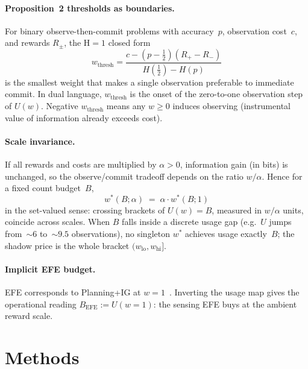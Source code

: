 \documentclass[runningheads]{llncs}
\begin{document}
\paragraph{Proposition~2 thresholds as boundaries.}
For binary observe-then-commit problems with accuracy~$p$, observation cost~$c$, and rewards $R_\pm$, the H${=}1$ closed form~\citep{cooper2026efe}
\begin{equation}
\label{eq:prop2}
w_{\mathrm{thresh}}
=
\frac{c-(p-\tfrac12)(R_+-R_-)}{H(\tfrac12)-H(p)}
\end{equation}
is the smallest weight that makes a single observation preferable to immediate commit. In dual language, $w_{\mathrm{thresh}}$ is the onset of the zero-to-one observation step of $U(w)$. Negative $w_{\mathrm{thresh}}$ means any $w\ge 0$ induces observing (instrumental value of information already exceeds cost).

\paragraph{Scale invariance.}
If all rewards and costs are multiplied by $\alpha>0$, information gain (in bits) is unchanged, so the observe/commit tradeoff depends on the ratio $w/\alpha$. Hence for a fixed count budget~$B$,
\begin{equation}
\label{eq:scale}
w^*(B;\alpha) \;=\; \alpha\cdot w^*(B;1)
\end{equation}
in the set-valued sense: crossing brackets of $U(w)=B$, measured in $w/\alpha$ units, coincide across scales. When $B$ falls inside a discrete usage gap (e.g.\ $U$ jumps from~$\sim\!6$ to~$\sim\!9.5$ observations), no singleton $w^*$ achieves usage exactly~$B$; the shadow price is the whole bracket $(w_{\mathrm{lo}},w_{\mathrm{hi}}]$.

\paragraph{Implicit EFE budget.}
EFE corresponds to Planning+IG at $w{=}1$~\citep{cooper2026efe}. Inverting the usage map gives the operational reading $B_{\mathrm{EFE}}:=U(w{=}1)$: the sensing EFE buys at the ambient reward scale.

\section{Methods}
\label{sec:method}
\end{document}
